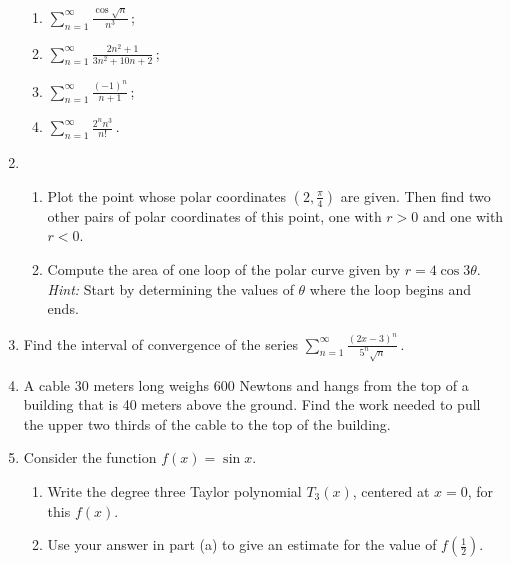 \documentclass[10pt]{article}
\begin{document}
\begin{enumerate}
\begin{multicols}{2}
\begin{enumerate}

\item $\displaystyle \sum_{n=1}^{\infty}\frac{\cos\sqrt{n}}{n^3}$\,;

\item $\displaystyle \sum_{n=1}^{\infty} \frac{2n^2+1}{3n^2+10n+2}$\,;

\item $\displaystyle \sum_{n=1}^{\infty} \frac{(-1)^{n}}{n+1}$\,;

\item $\displaystyle \sum_{n=1}^{\infty}\frac{2^n n^3}{n!}$\,.

\end{enumerate}
\end{multicols}


\item

\begin{enumerate}

\item Plot the point whose polar coordinates $\left(2, \frac{\pi}{4}\right)$  are given. Then find two other pairs of polar coordinates of this point, one with $r>0$ and one with $r<0$.
  
\item Compute the area of one loop of the polar curve given by $r=4\cos3\theta$. \emph{Hint:} Start by determining the values of $\theta$ where the loop begins and ends.

\end{enumerate}


\item Find the interval of convergence of the series $\displaystyle\sum_{n=1}^{\infty}\frac{(2x-3)^n}{5^n\sqrt{n}}$\,.


\item A cable 30 meters long weighs 600 Newtons and hangs from the top of a building that is 40 meters above the ground. Find the work needed to pull the upper two thirds of the cable to the top of the building.

\item Consider the function $f(x) = \sin x$.
\begin{enumerate}
\item Write the degree three Taylor polynomial $T_3(x)$, centered at $x=0$, for this $f(x)$. 

\item Use your answer in part (a) to give an estimate for the value of $f(\frac{1}{2})$. 


\end{enumerate}
\end{enumerate}
\end{document}
